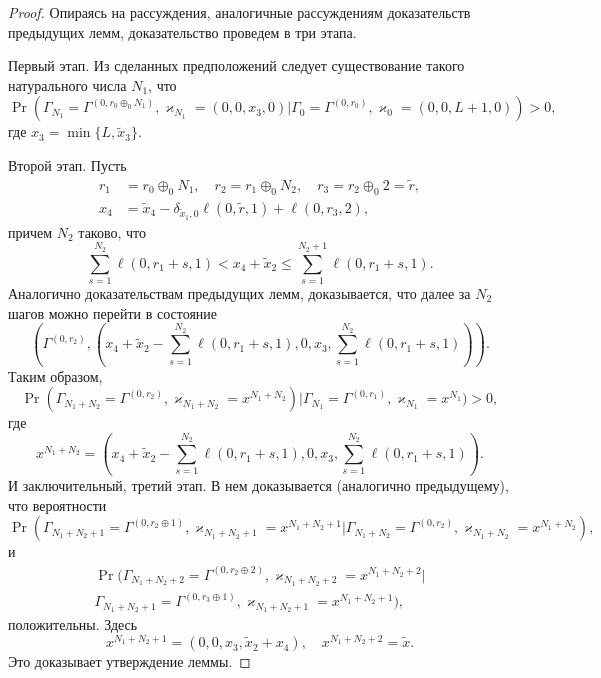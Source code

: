 \documentclass[a4paper,12pt,russian]{extarticle}
\begin{document}
\begin{proof}
Опираясь на рассуждения, аналогичные рассуждениям доказательств предыдущих лемм, доказательство проведем в три этапа.

Первый этап. Из сделанных предположений следует существование такого натурального числа $N_1$, что 
\begin{equation*}
\Pr(\Gamma_{N_1}=\Gamma^{(0,r_0\oplus_0 N_1)}, \varkappa_{N_1}=(0,0,x_3,0)|
\Gamma_{0}=\Gamma^{(0,r_0)}, \varkappa_{0}=(0,0,L+1,0))>0,
\end{equation*}
где $x_3=\min\{L,\tilde{x}_3\}$.

Второй этап. Пусть
\begin{align*}
r_1&=r_0\oplus_0 N_1, \quad r_2=r_1\oplus_0 N_2, \quad r_3=r_2\oplus_0 2 = \tilde{r},\\
x_4&=\tilde{x}_4 - \delta_{\tilde{x}_1,0}\ell(0,\tilde{r},1) + \ell(0,r_3,2),
\end{align*}
причем $N_2$ таково, что 
\begin{equation*}
\sum_{s=1}^{N_2} \ell(0,r_1+s,1) < x_4 + \tilde{x}_2 \leqslant \sum_{s=1}^{N_2+1} \ell(0,r_1+s,1).
\end{equation*}
Аналогично доказательствам предыдущих лемм, доказывается, что далее за $N_2$ шагов можно перейти в состояние 
\begin{equation*}
(\Gamma^{(0,r_2)}, (x_4 + \tilde{x}_2 - \sum_{s=1}^{N_2} \ell(0,r_1+s,1),0,x_3,\sum_{s=1}^{N_2} \ell(0,r_1+s,1))).
\end{equation*}
Таким образом,
\begin{equation*}
\Pr(\Gamma_{N_1+N_2}=\Gamma^{(0,r_2)}, \varkappa_{N_1+N_2}=x^{N_1+N_2 })|
\Gamma_{N_1}=\Gamma^{(0,r_1)}, \varkappa_{N_1}=x^{N_1})>0,
\end{equation*}
где 
\begin{equation*}
x^{N_1+N_2} = (x_4 + \tilde{x}_2 - \sum_{s=1}^{N_2} \ell(0,r_1+s,1),0,x_3,\sum_{s=1}^{N_2} \ell(0,r_1+s,1)).
\end{equation*}
И заключительный, третий этап. В нем доказывается (аналогично предыдущему), что вероятности
\begin{equation*}
\Pr(\Gamma_{N_1+N_2+1}=\Gamma^{(0,r_2\oplus 1)}, \varkappa_{N_1+N_2+1}=x^{N_1+N_2+1}|
\Gamma_{N_1+N_2}=\Gamma^{(0,r_2)}, \varkappa_{N_1+N_2}=x^{N_1+N_2}),
\end{equation*}
и 
\begin{multline*}
\Pr(\Gamma_{N_1+N_2+2}=\Gamma^{(0,r_2\oplus 2)}, \varkappa_{N_1+N_2+2}=x^{N_1+N_2+2}|\\
\Gamma_{N_1+N_2+1}=\Gamma^{(0,r_3\oplus 1)}, \varkappa_{N_1+N_2+1}=x^{N_1+N_2+1}),
\end{multline*}
положительны.  Здесь 
\begin{equation*}
x^{N_1+N_2 + 1} = (0,0,x_3,\tilde{x}_2+x_4), \quad x^{N_1+N_2 + 2} = \tilde{x}.
\end{equation*}
Это доказывает утверждение леммы.
\end{proof}
\end{document}
